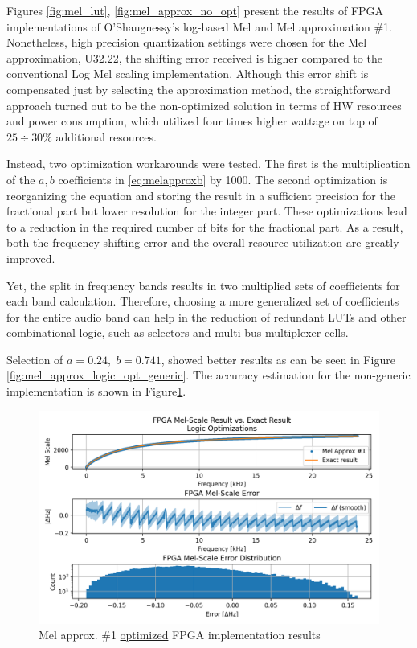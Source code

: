 Figures \ref{fig:mel_lut}, \ref{fig:mel_approx_no_opt} 
present the results of FPGA implementations
of O'Shaugnessy's log-based Mel and Mel approximation \#1.
Nonetheless, high precision quantization settings were chosen
for the Mel approximation, U32.22,  
the shifting error received is higher compared 
to the conventional Log Mel scaling implementation.
Although this error shift is compensated 
just by selecting the approximation method, 
the straightforward approach 
turned out to be the non-optimized solution 
in terms of HW resources and power consumption,
which utilized four times higher wattage on top of \(25 \div 30 \%\) 
additional resources.

Instead, two optimization workarounds were tested.
The first is the multiplication of the \(a, b\) coefficients
in \ref{eq:melapproxb} by 1000. 
The second optimization is reorganizing the equation
and storing the result in a sufficient precision
for the fractional part but lower resolution for the integer part.  
These optimizations lead to a reduction in the 
required number of bits for the fractional part.
As a result, both the frequency shifting error 
and the overall resource utilization are greatly improved.

Yet, the split in frequency bands results in two multiplied sets
of coefficients for each band calculation.
Therefore, choosing a more generalized set 
of coefficients for the entire audio band can help 
in the reduction of redundant LUTs and other combinational logic, 
such as selectors and multi-bus multiplexer cells.

Selection of \(a=0.24,\;b=0.741\), showed better results
as can be seen in Figure \ref{fig:mel_approx_logic_opt_generic}.
The accuracy estimation for the non-generic implementation
is shown in Figure\;\ref{fig:mel_approx_logic_opt}.

\begin{figure}[H]
    \centering
    \includegraphics[width=\linewidth]{Scaling/images/mel_approx_logic_opt}
    \caption{Mel approx. \#1 \underline{optimized} FPGA implementation results}\label{fig:mel_approx_logic_opt}
\end{figure}


